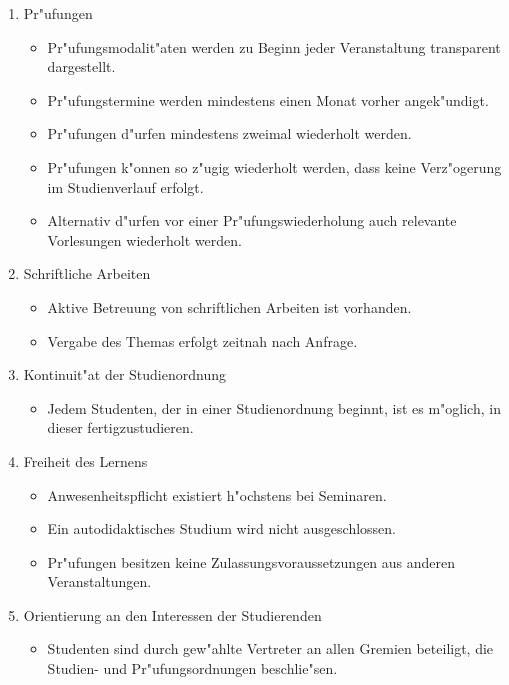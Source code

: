 \documentclass[a4paper,11pt]{article}
\begin{document}
\begin{enumerate}
\item Pr"ufungen
 \begin{itemize}
 \item Pr"ufungsmodalit"aten werden zu Beginn jeder Veranstaltung transparent dargestellt.
 \item Pr"ufungstermine werden mindestens einen Monat vorher angek"undigt.
 \item Pr"ufungen d"urfen mindestens zweimal wiederholt werden.
 \item Pr"ufungen k"onnen so z"ugig wiederholt werden, dass keine Verz"ogerung im Studienverlauf erfolgt.
 \item Alternativ d"urfen vor einer Pr"ufungswiederholung auch relevante Vorlesungen wiederholt werden.
 \end{itemize}

\item Schriftliche Arbeiten
 \begin{itemize}
 \item Aktive Betreuung von schriftlichen Arbeiten ist vorhanden.
 \item Vergabe des Themas erfolgt zeitnah nach Anfrage.
 \end{itemize}

\item Kontinuit"at der Studienordnung
 \begin{itemize}
 \item Jedem Studenten, der in einer Studienordnung beginnt, ist es m"oglich, in dieser fertigzustudieren.
 \end{itemize}

\item Freiheit des Lernens
 \begin{itemize}
 \item Anwesenheitspflicht existiert h"ochstens bei Seminaren.
 \item Ein autodidaktisches Studium wird nicht ausgeschlossen.
 \item Pr"ufungen besitzen keine Zulassungsvoraussetzungen aus anderen Veranstaltungen.
 \end{itemize}

\item Orientierung an den Interessen der Studierenden
 \begin{itemize}
 \item Studenten sind durch gew"ahlte Vertreter an allen Gremien beteiligt, die Studien- und Pr"ufungsordnungen beschlie"sen.
 \end{itemize}


\end{enumerate}
\end{document}
